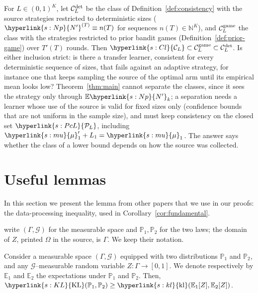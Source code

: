 \documentclass[11pt]{article}
\newcommand{\sy}[2]{\hyperlink{#1}{#2}}
\newcommand{\E}{\mathbb{E}}
\newcommand{\KL}{\sy{s:KL}{\mathrm{KL}}}
\newcommand{\kl}{\sy{s:kl}{\mathrm{kl}}}
\newcommand{\N}{\mathbb{N}}
\newcommand{\PcL}[1][L]{\sy{s:PcL}{\mathcal{P}_{#1}}}
\newcommand{\ClL}[1][L]{\sy{s:Cl}{\mathcal{C}_{#1}}}
\newcommand{\Np}{\sy{s:Np}{N'}}
\newcommand{\mean}{\sy{s:mu}{\mu}}
\begin{document}
\begin{openquestion}\label{oq:deterministic}
For $L\in(0,1)^K$, let $\mathcal C^{\rm det}_L$ be the class of Definition~\ref{def:consistency}
with the source strategies restricted to deterministic sizes ($\Np^{(T)}\equiv n(T)$ for sequences
$n(T)\in\N^K$), and $\mathcal C^{\rm game}_L$ the class with the strategies restricted to prior
bandit games (Definition~\ref{def:prior-game}) over $T'(T)$ rounds. Then
$\ClL\subset\mathcal C^{\rm game}_L\subset\mathcal C^{\rm det}_L$. Is either inclusion strict: is
there a transfer learner, consistent for every deterministic sequence of sizes, that fails against
an adaptive strategy, for instance one that keeps sampling the source of the optimal arm until its
empirical mean looks low? Theorem~\ref{thm:main} cannot separate the classes, since it sees the
strategy only through $\E \Np_k$; a separation needs a learner whose use of the source is valid for
fixed sizes only (confidence bounds that are not uniform in the sample size), and must keep
consistency on the closed set $\PcL$, including $\mean'_1+L_1=\mean_1$. The answer says whether the
class of a lower bound depends on how the source was collected.
\end{openquestion}

\appendix

\section{Useful lemmas}\label{sec:cited}

In this section we present the lemma from other papers that we use in our proofs: the
data-processing inequality, used in Corollary~\ref{cor:fundamental}.

\citet{GMS19} write $(\Gamma,\mathcal G)$ for the measurable space and $\mathbb P_1,\mathbb P_2$ for
the two laws; the domain of $Z$, printed $\Omega$ in the source, is $\Gamma$. We keep their
notation.

\begin{lemma}\label{cite:GMS19-Lemma1}
Consider a measurable space $(\Gamma,\mathcal G)$ equipped with two distributions $\mathbb P_1$ and
$\mathbb P_2$, and any $\mathcal G$--measurable random variable $Z:\Gamma\to[0,1]$. We denote
respectively by $\mathbb E_1$ and $\mathbb E_2$ the expectations under $\mathbb P_1$ and $\mathbb P_2$.
Then, $\KL(\mathbb P_1,\mathbb P_2)\ge\kl(\mathbb E_1[Z],\mathbb E_2[Z])$.
\end{lemma}
\end{document}
